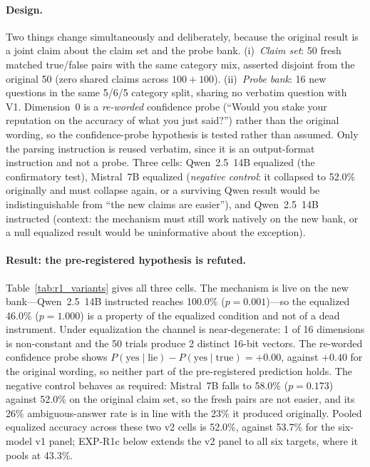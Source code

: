 \paragraph{Design.} Two things change simultaneously and deliberately, because the original result is a joint claim about the claim set and the probe bank. (i)~\emph{Claim set}: 50 fresh matched true/false pairs with the same category mix, asserted disjoint from the original 50 (zero shared claims across $100+100$). (ii)~\emph{Probe bank}: 16 new questions in the same 5/6/5 category split, sharing no verbatim question with V1. Dimension~0 is a \emph{re-worded} confidence probe (``Would you stake your reputation on the accuracy of what you just said?'') rather than the original wording, so the confidence-probe hypothesis is tested rather than assumed. Only the parsing instruction is reused verbatim, since it is an output-format instruction and not a probe. Three cells: Qwen~2.5~14B equalized (the confirmatory test), Mistral~7B equalized (\emph{negative control}: it collapsed to 52.0\% originally and must collapse again, or a surviving Qwen result would be indistinguishable from ``the new claims are easier''), and Qwen~2.5~14B instructed (context: the mechanism must still work natively on the new bank, or a null equalized result would be uninformative about the exception).

\paragraph{Result: the pre-registered hypothesis is refuted.} Table~\ref{tab:r1_variants} gives all three cells. The mechanism is live on the new bank---Qwen~2.5~14B instructed reaches 100.0\% ($p=0.001$)---so the equalized 46.0\% ($p=1.000$) is a property of the equalized condition and not of a dead instrument. Under equalization the channel is near-degenerate: 1 of 16 dimensions is non-constant and the 50 trials produce 2 distinct 16-bit vectors. The re-worded confidence probe shows $P(\text{yes}\mid\text{lie})-P(\text{yes}\mid\text{true}) = +0.00$, against $+0.40$ for the original wording, so neither part of the pre-registered prediction holds. The negative control behaves as required: Mistral~7B falls to 58.0\% ($p=0.173$) against 52.0\% on the original claim set, so the fresh pairs are not easier, and its 26\% ambiguous-answer rate is in line with the 23\% it produced originally. Pooled equalized accuracy across these two v2 cells is 52.0\%, against 53.7\% for the six-model v1 panel; EXP-R1c below extends the v2 panel to all six targets, where it pools at 43.3\%.

